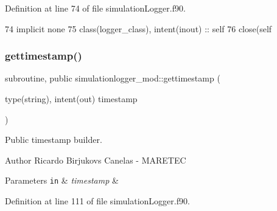 Definition at line 74 of file simulation\+Logger.\+f90.


\begin{DoxyCode}
74     \textcolor{keywordtype}{implicit none}
75     \textcolor{keywordtype}{class}(logger\_class), \textcolor{keywordtype}{intent(inout)} :: self
76     \textcolor{keyword}{close}(self%
\end{DoxyCode}
\mbox{\label{namespacesimulationlogger__mod_abff1db7e1655cb59097146d78e650672}} 
\subsubsection{\texorpdfstring{gettimestamp()}{gettimestamp()}}
{\footnotesize\ttfamily subroutine, public simulationlogger\+\_\+mod\+::gettimestamp (\begin{DoxyParamCaption}\item[{type(string), intent(out)}]{timestamp }\end{DoxyParamCaption})}



Public timestamp builder. 

\begin{DoxyAuthor}{Author}
Ricardo Birjukovs Canelas -\/ M\+A\+R\+E\+T\+EC 
\end{DoxyAuthor}

\begin{DoxyParams}[1]{Parameters}
\mbox{\tt in}  & {\em timestamp} & \\
\hline
\end{DoxyParams}


Definition at line 111 of file simulation\+Logger.\+f90.


